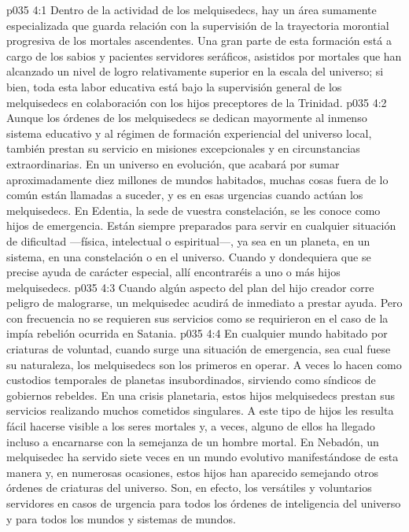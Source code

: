 \vs p035 4:1 Dentro de la actividad de los melquisedecs, hay un área sumamente especializada que guarda relación con la supervisión de la trayectoria morontial progresiva de los mortales ascendentes. Una gran parte de esta formación está a cargo de los sabios y pacientes servidores seráficos, asistidos por mortales que han alcanzado un nivel de logro relativamente superior en la escala del universo; si bien, toda esta labor educativa está bajo la supervisión general de los melquisedecs en colaboración con los hijos preceptores de la Trinidad.
\vs p035 4:2 \pc Aunque los órdenes de los melquisedecs se dedican mayormente al inmenso sistema educativo y al régimen de formación experiencial del universo local, también prestan su servicio en misiones excepcionales y en circunstancias extraordinarias. En un universo en evolución, que acabará por sumar aproximadamente diez millones de mundos habitados, muchas cosas fuera de lo común están llamadas a suceder, y es en esas urgencias cuando actúan los melquisedecs. En Edentia, la sede de vuestra constelación, se les conoce como hijos de emergencia. Están siempre preparados para servir en cualquier situación de dificultad ---física, intelectual o espiritual---, ya sea en un planeta, en un sistema, en una constelación o en el universo. Cuando y dondequiera que se precise ayuda de carácter especial, allí encontraréis a uno o más hijos melquisedecs.
\vs p035 4:3 Cuando algún aspecto del plan del hijo creador corre peligro de malograrse, un melquisedec acudirá de inmediato a prestar ayuda. Pero con frecuencia no se requieren sus servicios como se requirieron en el caso de la impía rebelión ocurrida en Satania.
\vs p035 4:4 En cualquier mundo habitado por criaturas de voluntad, cuando surge una situación de emergencia, sea cual fuese su naturaleza, los melquisedecs son los primeros en operar. A veces lo hacen como custodios temporales de planetas insubordinados, sirviendo como síndicos de gobiernos rebeldes. En una crisis planetaria, estos hijos melquisedecs prestan sus servicios realizando muchos cometidos singulares. A este tipo de hijos les resulta fácil hacerse visible a los seres mortales y, a veces, alguno de ellos ha llegado incluso a encarnarse con la semejanza de un hombre mortal. En Nebadón, un melquisedec ha servido siete veces en un mundo evolutivo manifestándose de esta manera y, en numerosas ocasiones, estos hijos han aparecido semejando otros órdenes de criaturas del universo. Son, en efecto, los versátiles y voluntarios servidores en casos de urgencia para todos los órdenes de inteligencia del universo y para todos los mundos y sistemas de mundos.

